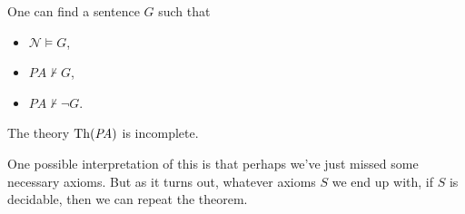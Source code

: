 \begin{theorem}
  One can find a sentence $G$ such that
  \begin{itemize}
  \item $\mathcal{N} \models G$,
  \item $PA \nvdash G$,
  \item $PA \nvdash \lnot G$.
  \end{itemize}
\end{theorem}

\begin{remark}
  The theory $\operatorname{Th}(\mathit{PA})$ is incomplete.
\end{remark}

One possible interpretation of this is that perhaps we've just missed some
necessary axioms.
But as it turns out, whatever axioms $S$ we end up with, if $S$ is decidable,
then we can repeat the theorem.

